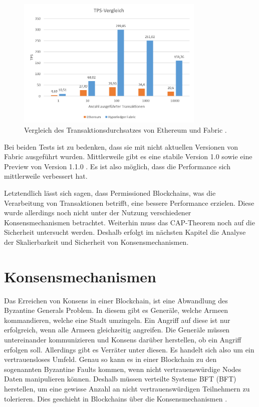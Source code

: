 \begin{figure}[!htbp]
  \centering
    \includegraphics[width=0.8\textwidth,angle=0]{images/TPS-ethvshyp}
     \caption{Vergleich des Transaktionsdurchsatzes von Ethereum und Fabric \cite{PongnumkulPerformanceAnalysisPrivate2017}.}
    \label{fig:tps-ethereum-vs-hyperledger}
\end{figure} 

Bei beiden Tests ist zu bedenken, dass sie mit nicht aktuellen Versionen von Fabric ausgeführt wurden. Mittlerweile gibt es eine stabile Version 1.0 sowie eine Preview von Version 1.1.0 \cite{HyperledgerFabricTeamHyperledgerFabricReleases2018}. Es ist also möglich, dass die Performance sich mittlerweile verbessert hat.

Letztendlich lässt sich sagen, dass Permissioned Blockchains, was die Verarbeitung von Transaktionen betrifft, eine bessere Performance erzielen. Diese wurde allerdings noch nicht unter der Nutzung verschiedener Konsensmechanismen betrachtet. Weiterhin muss das CAP-Theorem noch auf die Sicherheit untersucht werden. Deshalb erfolgt im nächsten Kapitel die Analyse der Skalierbarkeit und Sicherheit von Konsensmechanismen.

\section{Konsensmechanismen}
\label{sec:eval-konsens}
Das Erreichen von Konsens in einer Blockchain, ist eine Abwandlung des Byzantine Generals Problem. In diesem gibt es Generäle, welche Armeen kommandieren, welche eine Stadt umzingeln. Ein Angriff auf diese ist nur erfolgreich, wenn alle Armeen gleichzeitig angreifen. Die Generäle müssen untereinander kommunizieren und Konsens darüber herstellen, ob ein Angriff erfolgen soll. Allerdings gibt es Verräter unter diesen. Es handelt sich also um ein vertrauensloses Umfeld. Genau so kann es in einer Blockchain zu den sogenannten Byzantine Faults kommen, wenn nicht vertrauenswürdige Nodes Daten manipulieren können. Deshalb müssen verteilte Systeme \acl{BFT} (\acs{BFT}) herstellen, um eine gewisse Anzahl an nicht vertrauenswürdigen Teilnehmern zu tolerieren. Dies geschieht in Blockchains über die Konsensmechanismen \cite{ZhengBlockchainChallengesOpportunities2017}.

